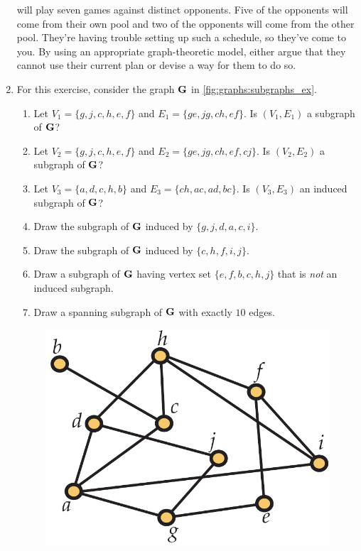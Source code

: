 \begin{enumerate}
  will play seven games against distinct opponents. Five of the
  opponents will come from their own pool and two of the opponents
  will come from the other pool. They're having trouble setting up
  such a schedule, so they've come to you. By using an appropriate
  graph-theoretic model, either argue that they cannot use their
  current plan or devise a way for them to do so.
\item For this exercise, consider the graph $\mathbf{G}$ in
  \autoref{fig:graphs:subgraphs_ex}.
  \begin{enumerate}
  \item Let $V_1=\{g,j,c,h,e,f\}$ and $E_1=\{ge,jg,ch,ef\}$. Is
    $(V_1,E_1)$ a subgraph of $\mathbf{G}$?
  \item Let $V_2=\{g,j,c,h,e,f\}$ and $E_2=\{ge,jg,ch,ef,cj\}$. Is
    $(V_2,E_2)$ a subgraph of $\mathbf{G}$?
  \item Let $V_3=\{a,d,c,h,b\}$ and $E_3=\{ch,ac,ad,bc\}$. Is
    $(V_3,E_3)$ an induced subgraph of $\mathbf{G}$?
  \item Draw the subgraph of $\mathbf{G}$ induced by $\{g,j,d,a,c,i\}$.
  \item Draw the subgraph of $\mathbf{G}$ induced by $\{c,h,f,i,j\}$.
  \item Draw a subgraph of $\mathbf{G}$ having vertex set $\{e,f,b,c,h,j\}$
    that is \emph{not} an induced subgraph.
  \item Draw a spanning subgraph of $\mathbf{G}$ with exactly $10$ edges.
  \end{enumerate}
 \begin{figure}[h]
    \centering
    \includegraphics[scale=0.5]{graphs-figs/subgraphs_ex}

\end{figure}
\end{enumerate}
